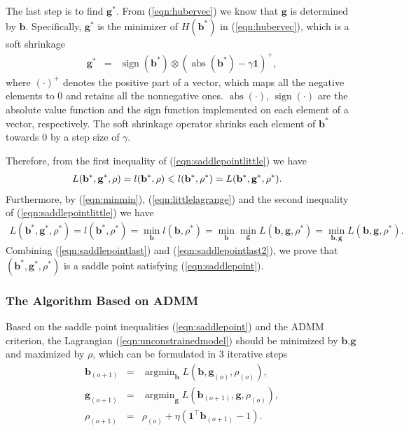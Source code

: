\documentclass[twoside,11pt]{article}
\DeclareMathOperator*{\argmin}{argmin}
\DeclareMathOperator*{\sign}{sign}
\DeclareMathOperator*{\abs}{abs}
\begin{document}
The last step is to find $\mathbf{g}^*$. From (\ref{eqn:hubervec}) we know that $\mathbf{g}$ is determined by $\mathbf{b}$. Specifically, $\mathbf{g}^*$ is the minimizer of $H(\mathbf{b}^*)$ in (\ref{eqn:hubervec}), which is a soft shrinkage \citep{LASSO}
\begin{eqnarray}
\label{eqn:softshrink0}
\mathbf{g}^*&=&\sign(\mathbf{b}^*)\otimes (\abs(\mathbf{b}^*)-\gamma\mathbf{1})^+,
\end{eqnarray}
where $(\cdot)^+$ denotes the positive part of a vector, which maps all the negative elements to $0$ and retains all the nonnegative ones. $\abs(\cdot)$, $\sign(\cdot)$ are the absolute value function and the sign function implemented on each element of a vector, respectively. The soft shrinkage operator shrinks each element of $\mathbf{b}^*$ towards $0$ by a step size of $\gamma$.

Therefore, from the first inequality of (\ref{eqn:saddlepointlittle}) we have
\begin{eqnarray}
\label{eqn:saddlepointlast}
L(\mathbf{b}^*,\mathbf{g}^*,\rho)= l(\mathbf{b}^*,\rho)\leqslant  l(\mathbf{b}^*,\rho^*)=L(\mathbf{b}^*,\mathbf{g}^*,\rho^*).\quad
\end{eqnarray}
Furthermore, by (\ref{eqn:minmin}), (\ref{eqn:littlelagrange}) and the second inequality of (\ref{eqn:saddlepointlittle}) we have
\begin{align}
\label{eqn:saddlepointlast2}
L(\mathbf{b}^*,\mathbf{g}^*,\rho^*)=l(\mathbf{b}^*,\rho^*)=\min_{\mathbf{b}}l(\mathbf{b},\rho^*)=\min_{\mathbf{b}}\min_{\mathbf{g}}L(\mathbf{b},\mathbf{g},\rho^*)=\min_{\mathbf{b},\mathbf{g}}L(\mathbf{b},\mathbf{g},\rho^*).
\end{align}
Combining (\ref{eqn:saddlepointlast}) and (\ref{eqn:saddlepointlast2}), we prove that $(\mathbf{b}^*,\mathbf{g}^*,\rho^*)$ is a saddle point satisfying (\ref{eqn:saddlepoint}).








\subsubsection{The Algorithm Based on ADMM}
\label{sec:alg}
Based on the saddle point inequalities (\ref{eqn:saddlepoint}) and the ADMM criterion, the Lagrangian (\ref{eqn:unconstrainedmodel}) should be minimized by $\mathbf{b}$,$\mathbf{g}$ and maximized by $\rho$, which can be formulated in $3$ iterative steps
\begin{eqnarray}
\label{eqn:ADMM1}
\mathbf{b}_{(o+1)}&=&\argmin_{\mathbf{b}} L(\mathbf{b},\mathbf{g}_{(o)},\rho_{(o)}),\\
\label{eqn:ADMM2}
\mathbf{g}_{(o+1)}&=&\argmin_{\mathbf{g}} L(\mathbf{b}_{(o+1)},\mathbf{g},\rho_{(o)}),\\
\label{eqn:ADMM3}
\rho_{(o+1)}&=&\rho_{(o)}+\eta(\mathbf{1}^\top\mathbf{b}_{(o+1)}-1).
\end{eqnarray}
\end{document}
